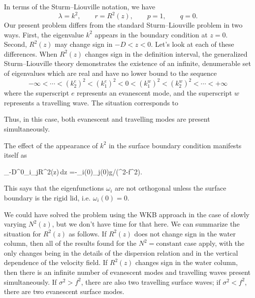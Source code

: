 \sourcepagebreak

In terms of the Sturm--Liouville notation, we have
\[
	\lambda=k^2,\qquad r=R^2(z),\qquad p=1,\qquad q=0.
\]
Our present problem differs from the standard Sturm--Liouville problem in two ways.
First, the eigenvalue $k^2$ appears in the boundary condition at $z=0$. Second, $R^2(z)$
may change sign in $-D<z<0$. Let's look at each of these differences. When $R^2(z)$
changes sign in the definition interval, the generalized Sturm--Liouville theory
demonstrates the existence of an infinite, denumerable set of eigenvalues which are real
and have no lower bound to the sequence
\[
	-\infty<\cdots<(k_2^e)^2<(k_1^e)^2<0<(k_1^w)^2<(k_2^w)^2<\cdots<+\infty
\]
where the superscript $e$ represents an evanescent mode, and the superscript $w$
represents a travelling wave. The situation corresponds to


Thus, in this case, both evanescent and travelling modes are present simultaneously.

The effect of the appearance of $k^2$ in the surface boundary condition manifests
itself as
\begin{waveequation}
	\int_{-D}^{0}\omega_i\omega_jR^2(z)\,dz
	=-\omega_i(0)\omega_j(0)g/(\sigma^2-f^2).
\end{waveequation}
This says that the eigenfunctions $\omega_i$ are not orthogonal unless the surface boundary is
the rigid lid, i.e. $\omega_i(0)=0$.

\sourcepagebreak

We could have solved the problem using the WKB approach in the case of
slowly varying $N^2(z)$, but we don't have time for that here. We can summarize the
situation for $R^2(z)$ as follows. If $R^2(z)$ does not change sign in the water column, then
all of the results found for the $N^2=\text{constant}$ case apply, with the only changes being
in the details of the dispersion relation and in the vertical dependence of the velocity
field. If $R^2(z)$ changes sign in the water column, then there is an infinite number of
evanescent modes and travelling waves present simultaneously. If $\sigma^2>f^2$, there are
also two travelling surface waves; if $\sigma^2<f^2$, there are two evanescent surface modes.
